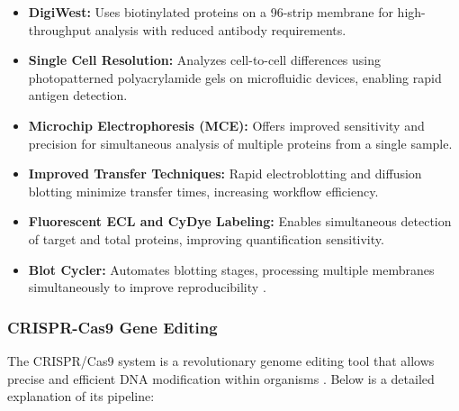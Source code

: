 \documentclass{article}
\newcounter{subsubsubsection}[subsubsection]
\begin{document}

\begin{itemize}
    \item \textbf{DigiWest:} Uses biotinylated proteins on a 96-strip membrane for high-throughput analysis with reduced antibody requirements.
    
    \item \textbf{Single Cell Resolution:} Analyzes cell-to-cell differences using photopatterned polyacrylamide gels on microfluidic devices, enabling rapid antigen detection.
    
    \item \textbf{Microchip Electrophoresis (MCE):} Offers improved sensitivity and precision for simultaneous analysis of multiple proteins from a single sample.
    
    \item \textbf{Improved Transfer Techniques:} Rapid electroblotting and diffusion blotting minimize transfer times, increasing workflow efficiency.
    
    \item \textbf{Fluorescent ECL and CyDye Labeling:} Enables simultaneous detection of target and total proteins, improving quantification sensitivity.
    
    \item \textbf{Blot Cycler:} Automates blotting stages, processing multiple membranes simultaneously to improve reproducibility \cite{singh2021emerging}.
\end{itemize}


\subsubsection{CRISPR-Cas9 Gene Editing}
The CRISPR/Cas9 system is a revolutionary genome editing tool that allows precise and efficient DNA modification within organisms \cite{crispr1, crispr2}. Below is a detailed explanation of its pipeline:
\end{document}
